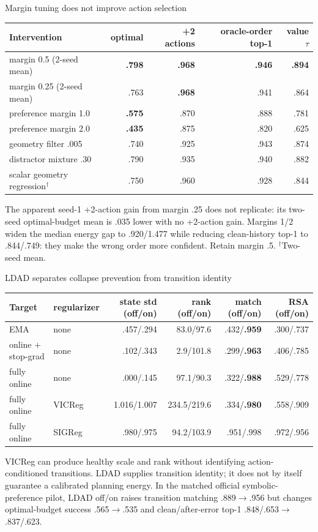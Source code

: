 \documentclass[aspectratio=169,10pt]{beamer}
\newcommand{\good}[1]{\textcolor{cgreen}{\textbf{#1}}}
\newcommand{\bad}[1]{\textcolor{cred}{\textbf{#1}}}
\begin{document}
\begin{frame}{Margin tuning does not improve action selection}
\small
\centering
\begin{tabular}{lrrrr}
\toprule
Intervention & optimal & +2 actions & oracle-order top-1 & value $\tau$\\
\midrule
margin 0.5 (2-seed mean) & \good{.798} & \good{.968} & \good{.946} & \good{.894}\\
margin 0.25 (2-seed mean) & .763 & \good{.968} & .941 & .864\\
preference margin 1.0 & \bad{.575} & .870 & .888 & .781\\
preference margin 2.0 & \bad{.435} & .875 & .820 & .625\\
geometry filter .005 & .740 & .925 & .943 & .874\\
distractor mixture .30 & .790 & .935 & .940 & .882\\
scalar geometry regression$^{\dagger}$ & .750 & .960 & .928 & .844\\
\bottomrule
\end{tabular}

\medskip
\raggedright
The apparent seed-1 +2-action gain from margin .25 does not replicate: its
two-seed optimal-budget mean is .035 lower with no +2-action gain. Margins 1/2 widen the
median energy gap to .920/1.477 while reducing clean-history top-1 to
.844/.749: they make the wrong order more confident. Retain margin .5.
$^{\dagger}$Two-seed mean.
\end{frame}

\begin{frame}{LDAD separates collapse prevention from transition identity}
\scriptsize
\centering
\begin{tabular}{llrrrr}
\toprule
Target & regularizer & state std (off/on) & rank (off/on) & match (off/on) & RSA (off/on)\\
\midrule
EMA & none & .457/.294 & 83.0/97.6 & .432/\good{.959} & .300/.737\\
online + stop-grad & none & .102/.343 & 2.9/101.8 & .299/\good{.963} & .406/.785\\
fully online & none & .000/.145 & 97.1/90.3 & .322/\good{.988} & .529/.778\\
fully online & VICReg & 1.016/1.007 & 234.5/219.6 & .334/\good{.980} & .558/.909\\
fully online & SIGReg & .980/.975 & 94.2/103.9 & .951/.998 & .972/.956\\
\bottomrule
\end{tabular}

\medskip
VICReg can produce healthy scale and rank without identifying
action-conditioned transitions. LDAD supplies transition identity; it does
not by itself guarantee a calibrated planning energy. In the matched official
symbolic-preference pilot, LDAD off/on raises transition matching
.889$\rightarrow$.956 but changes optimal-budget success .565$\rightarrow$.535 and
clean/after-error top-1 .848/.653$\rightarrow$.837/.623.
\end{frame}
\end{document}
